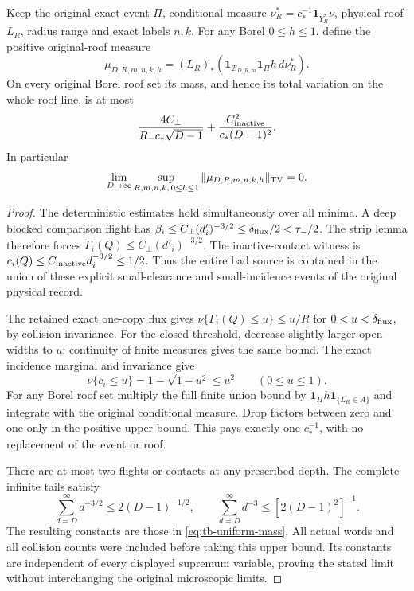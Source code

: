 \begin{theorem}
\label{thm:tb-uniform-source}
Keep the original exact event $\Pi$, conditional measure
$\nu_R^*=c_*^{-1}\mathbf1_{Y_R^*}\nu$, physical roof $L_R$,
radius range and exact labels $n,k$.  For any Borel $0\le h\le1$,
define the positive original-roof measure
\begin{equation}\label{eq:tb-bad-measure}
 \mu_{D,R,m,n,k,h}
   =(L_R)_*(\mathbf1_{\mathcal B_{D,R,m}}\mathbf1_\Pi h\,d\nu_R^*).
\end{equation}
On every original Borel roof set its mass, and hence its total
variation on the whole roof line, is at most
\begin{equation}\label{eq:tb-uniform-mass}
 \frac{4C_\perp}{R_-c_*\sqrt{D-1}}
          +\frac{C_{\rm inactive}^2}{c_*(D-1)^2}.
\end{equation}
In particular
\begin{equation}\label{eq:tb-uniform-limit}
 \lim_{D\to\infty}\sup_{R,m,n,k,\,0\le h\le1}
                      \|\mu_{D,R,m,n,k,h}\|_{\rm TV}=0.
\end{equation}
\end{theorem}
\begin{proof}
The deterministic estimates hold simultaneously over all minima.
A deep blocked comparison flight has
$\beta_i\le C_\perp(d'_i)^{-3/2}\le\delta_{\rm flux}/2<\tau_-/2$.
The strip lemma therefore forces
$\Gamma_i(Q)\le C_\perp(d'_i)^{-3/2}$.
The inactive-contact witness is
$c_i(Q)\le C_{\rm inactive}d_i^{-3/2}\le1/2$.
Thus the entire bad source is contained in the union of these
explicit small-clearance and small-incidence events of the original
physical record.

The retained exact one-copy flux gives
$\nu\{\Gamma_i(Q)\le u\}\le u/R$ for
$0<u<\delta_{\rm flux}$, by collision invariance.  For the
closed threshold, decrease slightly larger open widths to $u$;
continuity of finite measures gives the same bound.  The exact
incidence marginal and invariance give
\[
 \nu\{c_i\le u\}=1-\sqrt{1-u^2}\le u^2\qquad(0\le u\le1).
\]
For any Borel roof set multiply the full finite union bound by
$\mathbf1_\Pi h\mathbf1_{\{L_R\in A\}}$ and integrate with
the original conditional measure.  Drop factors between zero and
one only in the positive upper bound.  This pays exactly one
$c_*^{-1}$, with no replacement of the event or roof.

There are at most two flights or contacts at any prescribed depth.
The complete infinite tails satisfy
\[
 \sum_{d=D}^\infty d^{-3/2}\le2(D-1)^{-1/2},
 \qquad \sum_{d=D}^\infty d^{-3}\le[2(D-1)^2]^{-1}.
\]
The resulting constants are those in \eqref{eq:tb-uniform-mass}.
All actual words and all collision counts were included before
taking this upper bound.  Its constants are independent of every
displayed supremum variable, proving the stated limit without
interchanging the original microscopic limits.
\end{proof}

